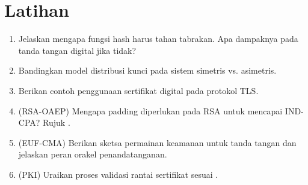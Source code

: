 \documentclass[../main.tex]{subfiles}
\begin{document}
\section{Latihan}
\begin{enumerate}
  \item Jelaskan mengapa fungsi hash harus tahan tabrakan. Apa dampaknya pada tanda tangan digital jika tidak?
  \item Bandingkan model distribusi kunci pada sistem simetris vs. asimetris.
  \item Berikan contoh penggunaan sertifikat digital pada protokol TLS.
  \item (RSA-OAEP) Mengapa padding diperlukan pada RSA untuk mencapai IND-CPA? Rujuk \citep{rfc8017}.
  \item (EUF-CMA) Berikan sketsa permainan keamanan untuk tanda tangan dan jelaskan peran orakel penandatanganan.
  \item (PKI) Uraikan proses validasi rantai sertifikat sesuai \citep{rfc5280}.
\end{enumerate}
\end{document}
